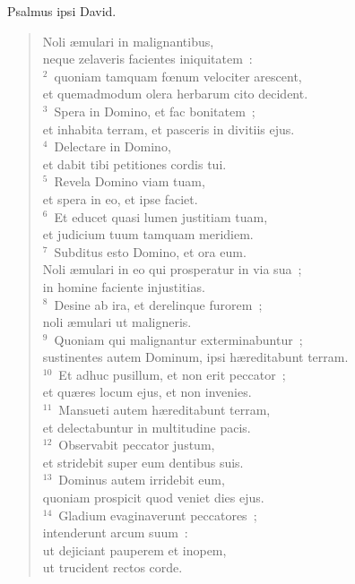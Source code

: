 \bchapter
\lettrine[lines=3,image=true,loversize=0.05,lraise=-0.03]{P}{}salmus ipsi David. \begin{flushleft}\begin{verse}\vspace{6pt}Noli \ae mulari in malignantibus,\\ neque zelaveris facientes iniquitatem~:\\
${}^{2}$~quoniam tamquam fœnum velociter arescent,\\ et quemadmodum olera herbarum cito decident.\\
${}^{3}$~Spera in Domino, et fac bonitatem~;\\ et inhabita terram, et pasceris in divitiis ejus.\\
${}^{4}$~Delectare in Domino,\\ et dabit tibi petitiones cordis tui.\\
${}^{5}$~Revela Domino viam tuam,\\ et spera in eo, et ipse faciet.\\
${}^{6}$~Et educet quasi lumen justitiam tuam,\\ et judicium tuum tamquam meridiem.\\
${}^{7}$~Subditus esto Domino, et ora eum.\\ Noli \ae mulari in eo qui prosperatur in via sua~;\\ in homine faciente injustitias.\\
${}^{8}$~Desine ab ira, et derelinque furorem~;\\ noli \ae mulari ut maligneris.\\
${}^{9}$~Quoniam qui malignantur exterminabuntur~;\\ sustinentes autem Dominum, ipsi h\ae reditabunt terram.\\
${}^{10}$~Et adhuc pusillum, et non erit peccator~;\\ et qu\ae res locum ejus, et non invenies.\\
${}^{11}$~Mansueti autem h\ae reditabunt terram,\\ et delectabuntur in multitudine pacis.\\
${}^{12}$~Observabit peccator justum,\\ et stridebit super eum dentibus suis.\\
${}^{13}$~Dominus autem irridebit eum,\\ quoniam prospicit quod veniet dies ejus.\\
${}^{14}$~Gladium evaginaverunt peccatores~;\\ intenderunt arcum suum~:\\ ut dejiciant pauperem et inopem,\\ ut trucident rectos corde.\\

\end{verse}
\end{flushleft}

